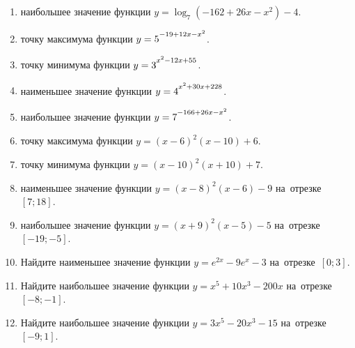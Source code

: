 \documentclass[a4paper,10pt]{article}
\begin{document}
\begin{enumerate}
\item {} наибольшее значение функции $y=\log_7\left(-162+26x-x^2\right)-4$.

\item {} точку максимума функции $y=5\strut^{-19+12x-x^2}$.

\item {} точку минимума функции $y=3\strut^{x^2-12x+55}$.

\item {} наименьшее значение функции $y=4\strut^{x^2+30x+228}$.

\item {} наибольшее значение функции $y=7\strut^{-166+26x-x^2}$.

\item {} точку максимума функции $y=\left(x-6\right)^2\left(x-10\right)+6$.

\item {} точку минимума функции $y=\left(x-10\right)^2\left(x+10\right)+7$.

\item {} наименьшее значение функции $y=\left(x-8\right)^2\left(x-6\right)-9$ на~отрезке~$\left[7;18\right]$.

\item {} наибольшее значение функции $y=\left(x+9\right)^2\left(x-5\right)-5$ на~отрезке~$\left[-19;-5\right]$.

\item Найдите наименьшее значение функции $y=e^{2x}-9e^x-3$ на~отрезке~$\left[0;3\right]$.

\item Найдите наибольшее значение функции $y=x^5+10x^3-200x$ на~отрезке~$\left[-8;-1\right]$.

\item Найдите наибольшее значение функции $y=3x^5-20x^3-15$ на~отрезке~$\left[-9;1\right]$.

\end{enumerate}
\end{document}
